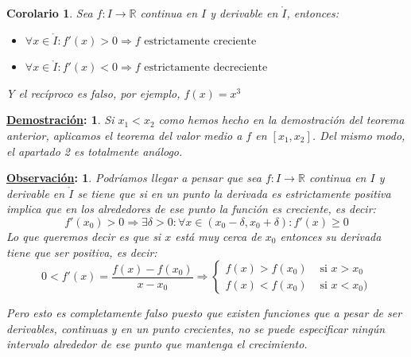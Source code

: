 \documentclass[10pt,a4paper,openright]{book}
\theoremstyle{break}
\newtheorem*{coro}{Corolario}
\newtheorem*{demo}{\underline{Demostración}:}
\newtheorem*{obs}{\underline{Observación}:}
\begin{document}
\begin{coro}
Sea $f:I\rightarrow\mathbb R$ continua en $I$ y derivable en $\mathring{I}$, entonces:
\begin{itemize}
\item $\forall x\in \mathring{I}: f'(x)>0\Rightarrow f\mbox{ estrictamente creciente}$
\item $\forall x\in \mathring{I}: f'(x)<0\Rightarrow f\mbox{ estrictamente decreciente}$
\end{itemize}
Y el recíproco es falso, por ejemplo, $f(x)=x^3$
\end{coro}
\begin{demo}
Si $x_1<x_2$ como hemos hecho en la demostración del teorema anterior, aplicamos el teorema del valor medio a $f$ en $[x_1,x_2]$. Del mismo modo, el apartado 2 es totalmente análogo.
\end{demo}

\begin{obs}
Podríamos llegar a pensar que sea $f:I\rightarrow\mathbb R$ continua en $I$ y derivable en $\mathring{I}$ se tiene que si en un punto la derivada es estrictamente positiva implica que en los alrededores de ese punto la función es creciente, es decir:
$$f'(x_0)>0\Rightarrow \exists \delta>0: \forall x\in (x_0-\delta, x_0+\delta): f'(x)\geq 0$$
Lo que queremos decir es que si $x$ está muy cerca de $x_0$ entonces su derivada tiene que ser positiva, es decir:
$$0<f'(x)=\frac{f(x)-f(x_0)}{x-x_0}\Rightarrow\begin{cases}f(x)>f(x_0) & \mbox{ si }x>x_0\\ f(x)<f(x_0) & \mbox{ si }x<x_0)\end{cases}$$

Pero esto es completamente falso puesto que existen funciones que a pesar de ser derivables, continuas y en un punto crecientes, no se puede especificar ningún intervalo alrededor de ese punto que mantenga el crecimiento.
\end{obs}
\end{document}
